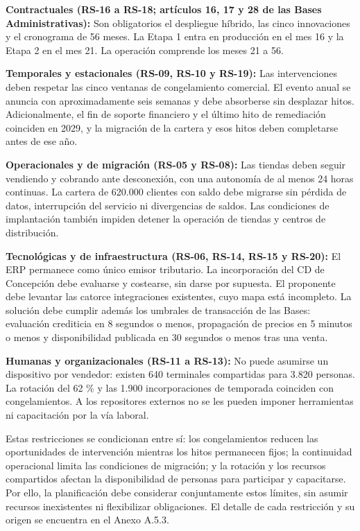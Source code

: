 \documentclass[11pt]{article}
\begin{document}
\textbf{Contractuales (RS-16 a RS-18; artículos 16, 17 y 28 de las Bases Administrativas):} Son obligatorios el despliegue híbrido, las cinco innovaciones y el cronograma de 56 meses. La Etapa 1 entra en producción en el mes 16 y la Etapa 2 en el mes 21. La operación comprende los meses 21 a 56.

\textbf{Temporales y estacionales (RS-09, RS-10 y RS-19):} Las intervenciones deben respetar las cinco ventanas de congelamiento comercial. El evento anual se anuncia con aproximadamente seis semanas y debe absorberse sin desplazar hitos. Adicionalmente, el fin de soporte financiero y el último hito de remediación coinciden en 2029, y la migración de la cartera y esos hitos deben completarse antes de ese año.

\textbf{Operacionales y de migración (RS-05 y RS-08):} Las tiendas deben seguir vendiendo y cobrando ante desconexión, con una autonomía de al menos 24 horas continuas. La cartera de 620.000 clientes con saldo debe migrarse sin pérdida de datos, interrupción del servicio ni divergencias de saldos. Las condiciones de implantación también impiden detener la operación de tiendas y centros de distribución.

\textbf{Tecnológicas y de infraestructura (RS-06, RS-14, RS-15 y RS-20):} El ERP permanece como único emisor tributario. La incorporación del CD de Concepción debe evaluarse y costearse, sin darse por supuesta. El proponente debe levantar las catorce integraciones existentes, cuyo mapa está incompleto. La solución debe cumplir además los umbrales de transacción de las Bases: evaluación crediticia en 8 segundos o menos, propagación de precios en 5 minutos o menos y disponibilidad publicada en 30 segundos o menos tras una venta.

\textbf{Humanas y organizacionales (RS-11 a RS-13):} No puede asumirse un dispositivo por vendedor: existen 640 terminales compartidas para 3.820 personas. La rotación del 62 \% y las 1.900 incorporaciones de temporada coinciden con congelamientos. A los repositores externos no se les pueden imponer herramientas ni capacitación por la vía laboral.

Estas restricciones se condicionan entre sí: los congelamientos reducen las oportunidades de intervención mientras los hitos permanecen fijos; la continuidad operacional limita las condiciones de migración; y la rotación y los recursos compartidos afectan la disponibilidad de personas para participar y capacitarse. Por ello, la planificación debe considerar conjuntamente estos límites, sin asumir recursos inexistentes ni flexibilizar obligaciones. El detalle de cada restricción y su origen se encuentra en el Anexo A.5.3. 
\end{document}
